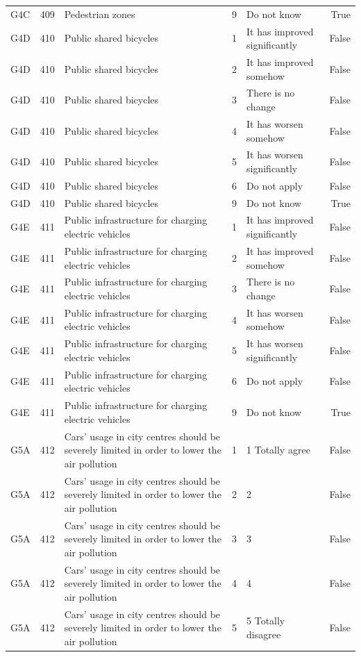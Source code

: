 \begin{tabular}{lrlllr}
G4C & 409 & Pedestrian zones & 9 & Do not know & True \\
G4D & 410 & Public shared bicycles & 1 & It has improved significantly & False \\
G4D & 410 & Public shared bicycles & 2 & It has improved somehow & False \\
G4D & 410 & Public shared bicycles & 3 & There is no change & False \\
G4D & 410 & Public shared bicycles & 4 & It has worsen somehow & False \\
G4D & 410 & Public shared bicycles & 5 & It has worsen significantly & False \\
G4D & 410 & Public shared bicycles & 6 & Do not apply & False \\
G4D & 410 & Public shared bicycles & 9 & Do not know & True \\
G4E & 411 & Public infrastructure for charging electric vehicles & 1 & It has improved significantly & False \\
G4E & 411 & Public infrastructure for charging electric vehicles & 2 & It has improved somehow & False \\
G4E & 411 & Public infrastructure for charging electric vehicles & 3 & There is no change & False \\
G4E & 411 & Public infrastructure for charging electric vehicles & 4 & It has worsen somehow & False \\
G4E & 411 & Public infrastructure for charging electric vehicles & 5 & It has worsen significantly & False \\
G4E & 411 & Public infrastructure for charging electric vehicles & 6 & Do not apply & False \\
G4E & 411 & Public infrastructure for charging electric vehicles & 9 & Do not know & True \\
G5A & 412 & Cars’ usage in city centres should be severely limited in order to lower the air pollution & 1 & 1  Totally agree & False \\
G5A & 412 & Cars’ usage in city centres should be severely limited in order to lower the air pollution & 2 & 2 & False \\
G5A & 412 & Cars’ usage in city centres should be severely limited in order to lower the air pollution & 3 & 3 & False \\
G5A & 412 & Cars’ usage in city centres should be severely limited in order to lower the air pollution & 4 & 4 & False \\
G5A & 412 & Cars’ usage in city centres should be severely limited in order to lower the air pollution & 5 & 5 Totally disagree & False \\

\end{tabular}
